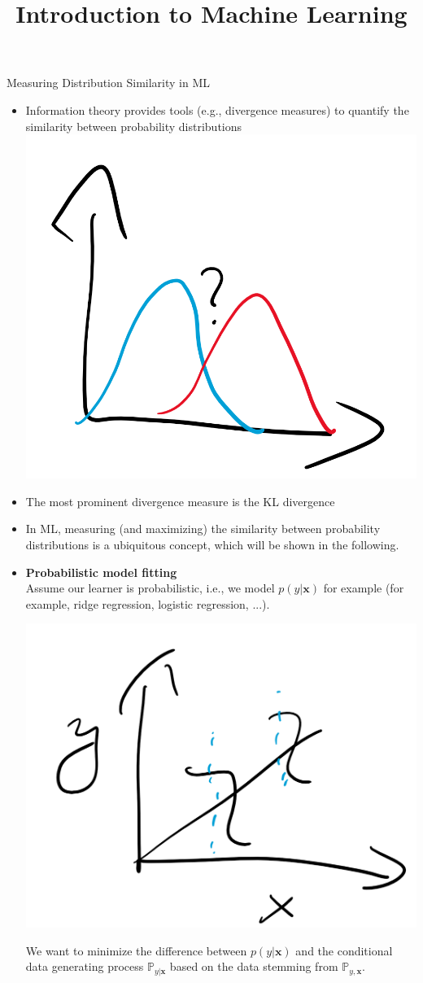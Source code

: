 \documentclass[11pt,compress,t,notes=noshow, xcolor=table]{beamer}
\title{Introduction to Machine Learning}
\date{}
\begin{document}

\begin{vbframe} {Measuring Distribution Similarity in ML}
\begin{itemize}
    \item Information theory provides tools (e.g., divergence measures) to quantify the similarity between probability distributions
\includegraphics[width=0.4\linewidth]{slides/information-theory/figure_man/kl_ml_dist_sim.png}
    \item The most prominent divergence measure is the KL divergence 
\item In ML, measuring (and maximizing) the similarity between probability distributions is a ubiquitous concept, which will be shown in the following.
\end{itemize}
\framebreak
\begin{itemize}
    \item \textbf{Probabilistic model fitting}\\
Assume our learner is probabilistic, i.e., we model $p(y| \mathbf{x})$ for example (for example, ridge regression, logistic regression, ...).

\includegraphics[width=0.4\linewidth]{slides/information-theory/figure_man/kl_ml_prob_fit.png}

We want to minimize the difference between $p(y \vert \mathbf{x})$ and the conditional data generating process $\mathbb{P}_{y\vert\mathbf{x}}$ based on the data stemming from $\mathbb{P}_{y, \mathbf{x}}.$

\lz


\end{itemize}
\end{vbframe}
\end{document}
